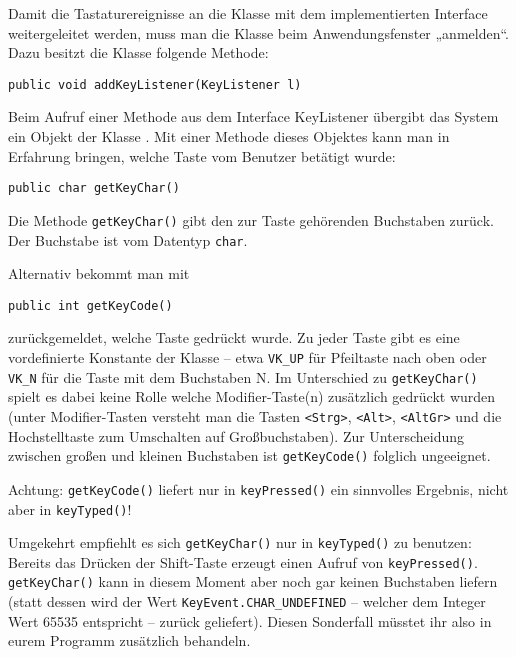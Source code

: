 Damit die Tastaturereignisse an die Klasse mit dem implementierten Interface
weitergeleitet werden, muss man die Klasse beim Anwendungsfenster „anmelden“.
Dazu besitzt die Klasse  folgende Methode:

\begin{lstlisting}
public void addKeyListener(KeyListener l)
\end{lstlisting}

Beim Aufruf einer Methode aus dem Interface KeyListener übergibt das System ein
Objekt der Klasse . Mit einer Methode dieses Objektes kann man
in Erfahrung bringen, welche Taste vom Benutzer betätigt wurde:

\begin{lstlisting}
public char getKeyChar() 
\end{lstlisting}

Die Methode \lstinline|getKeyChar()| gibt den zur Taste gehörenden Buchstaben
zurück. Der Buchstabe ist vom Datentyp \lstinline|char|.

Alternativ bekommt man mit

\begin{lstlisting}
public int getKeyCode() 

\end{lstlisting}

zurückgemeldet, welche Taste gedrückt wurde. Zu jeder Taste gibt es eine
vordefinierte Konstante der Klasse  – etwa \lstinline|VK_UP|
für Pfeiltaste nach oben oder \lstinline|VK_N| für die Taste mit dem Buchstaben
N. Im Unterschied zu \lstinline|getKeyChar()| spielt es dabei keine Rolle welche
Modifier-Taste(n) zusätzlich gedrückt wurden (unter Modifier-Tasten versteht man
die Tasten \lstinline|<Strg>|, \lstinline|<Alt>|, \lstinline|<AltGr>| und die
Hochstelltaste zum Umschalten auf Großbuchstaben). Zur Unterscheidung zwischen
großen und kleinen Buchstaben ist \lstinline|getKeyCode()| folglich ungeeignet.

Achtung: \lstinline|getKeyCode()| liefert nur in \lstinline|keyPressed()| ein
sinnvolles Ergebnis, nicht aber in \lstinline|keyTyped()|! 

Umgekehrt empfiehlt es sich \lstinline|getKeyChar()| nur in
\lstinline|keyTyped()| zu benutzen: Bereits das Drücken der Shift-Taste erzeugt
einen Aufruf von \lstinline|keyPressed()|. \lstinline|getKeyChar()| kann in
diesem Moment aber noch gar keinen Buchstaben liefern (statt dessen wird der
Wert \lstinline|KeyEvent.CHAR_UNDEFINED| -- welcher dem Integer Wert 65535
entspricht -- zurück geliefert). Diesen Sonderfall müsstet ihr also in eurem
Programm zusätzlich behandeln.

